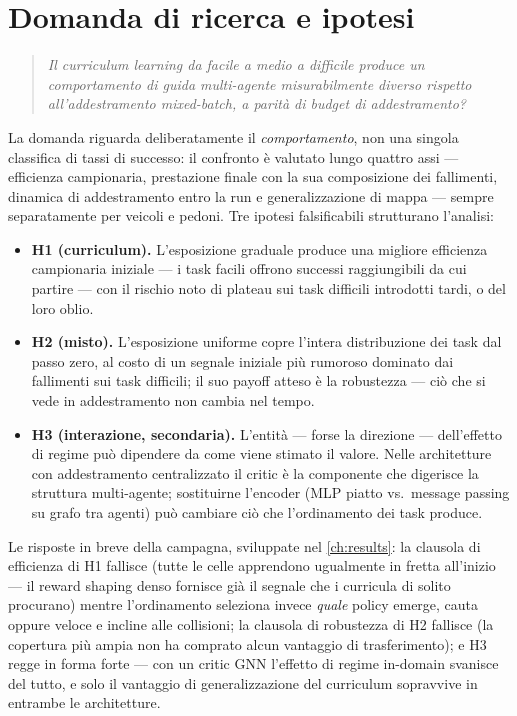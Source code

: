 \section{Domanda di ricerca e ipotesi}
\label{sec:rq}

\begin{quote}
  \emph{Il curriculum learning da facile a medio a difficile produce un
  comportamento di guida multi-agente misurabilmente diverso rispetto
  all'addestramento mixed-batch, a parità di budget di addestramento?}
\end{quote}

La domanda riguarda deliberatamente il \emph{comportamento}, non una
singola classifica di tassi di successo: il confronto è valutato lungo
quattro assi --- efficienza campionaria, prestazione finale con la sua
composizione dei fallimenti, dinamica di addestramento entro la run e
generalizzazione di mappa --- sempre separatamente per veicoli e pedoni.
Tre ipotesi falsificabili strutturano l'analisi:

\begin{itemize}
  \item \textbf{H1 (curriculum).} L'esposizione graduale produce una
        migliore efficienza campionaria iniziale --- i task facili
        offrono successi raggiungibili da cui partire --- con il rischio
        noto di plateau sui task difficili introdotti tardi, o del loro
        oblio.
  \item \textbf{H2 (misto).} L'esposizione uniforme copre l'intera
        distribuzione dei task dal passo zero, al costo di un segnale
        iniziale più rumoroso dominato dai fallimenti sui task
        difficili; il suo payoff atteso è la robustezza --- ciò che si
        vede in addestramento non cambia nel tempo.
  \item \textbf{H3 (interazione, secondaria).} L'entità --- forse la
        direzione --- dell'effetto di regime può dipendere da come viene
        stimato il valore. Nelle architetture con addestramento
        centralizzato il critic è la componente che digerisce la
        struttura multi-agente; sostituirne l'encoder (MLP piatto vs.\
        message passing su grafo tra agenti) può cambiare ciò che
        l'ordinamento dei task produce.
\end{itemize}

Le risposte in breve della campagna, sviluppate nel \cref{ch:results}:
la clausola di efficienza di H1 fallisce (tutte le celle apprendono
ugualmente in fretta all'inizio --- il reward shaping denso fornisce già
il segnale che i curricula di solito procurano) mentre l'ordinamento
seleziona invece \emph{quale} policy emerge, cauta oppure veloce e
incline alle collisioni; la clausola di robustezza di H2 fallisce (la
copertura più ampia non ha comprato alcun vantaggio di trasferimento); e
H3 regge in forma forte --- con un critic GNN l'effetto di regime
in-domain svanisce del tutto, e solo il vantaggio di generalizzazione
del curriculum sopravvive in entrambe le architetture.

